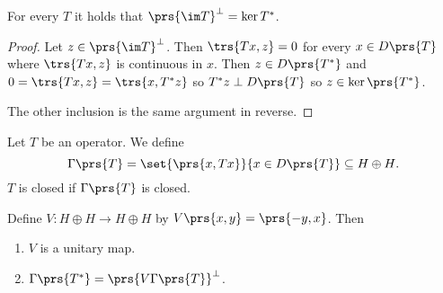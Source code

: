 \documentclass[10pt, twoside]{book}
\begin{document}
\begin{proposition}
For every $T$ it holds that $\prs{\im T}^\perp = \ker T^*$.
\end{proposition}

\begin{proof}
Let $z \in \prs{\im T}^\perp$. Then $\trs{Tx, z} = 0$ for every $x \in D\prs{T}$ where $\trs{Tx, z}$ is continuous in $x$. Then $z \in D\prs{T^*}$ and $0 = \trs{Tx, z} = \trs{x, T^* z}$ so $T^* z \perp D\prs{T}$ so $z \in \ker\prs{T^*}$.

The other inclusion is the same argument in reverse.
\end{proof}

\begin{definition}
Let $T$ be an operator. We define
\[\Gamma\prs{T} = \set{\prs{x, Tx}}{x \in D\prs{T}} \subseteq H \oplus H \text{.}\]
$T$ is closed if $\Gamma\prs{T}$ is closed.
\end{definition}

\begin{proposition}
Define $V \colon H \oplus H \to H \oplus H$ by $V\prs{x,y} = \prs{-y,x}$. Then
\begin{enumerate}
\item $V$ is a unitary map.
\item $\Gamma\prs{T^*} = \prs{V\Gamma\prs{T}}^\perp$.
\end{enumerate}
\end{proposition}
\end{document}
